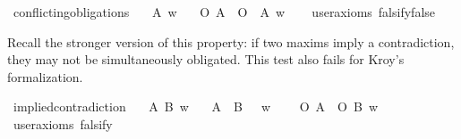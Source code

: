 \begin{isabellebody}
\begin{isamarkuptext}
\end{isamarkuptext}\isamarkuptrue%
\isamarkupfalse%
\ conflicting{\isacharunderscore}obligations{\isacharcolon}\isanewline
\ \ \ A\ w\isanewline
\ \ \ {\isachardoublequoteopen}{\isacharparenleft}O\ {\isacharbraceleft}A{\isacharbraceright}\ \isactrlbold {\isasymand}\ O\ {\isacharbraceleft}\isactrlbold {\isasymnot}\ A{\isacharbraceright}{\isacharparenright}\ w{\isachardoublequoteclose}\isanewline
\ \ \isamarkupfalse%
\ {\isacharbrackleft}user{\isacharunderscore}axioms{\isacharcomma}\ falsify{\isacharequal}false{\isacharbrackright}%
\isadelimproof
\ %
\endisadelimproof
%
\isatagproof
{}\isamarkupfalse%
\isanewline
%
%
\endisatagproof
{\isafoldproof}%
%
\isadelimproof
%
\endisadelimproof
%
\begin{isamarkuptext}%
Recall the stronger version of this property: if two maxims imply a
        contradiction, they may not be simultaneously obligated. This test also fails for Kroy's formalization.%
\end{isamarkuptext}\isamarkuptrue%
\isamarkupfalse%
\ implied{\isacharunderscore}contradiction{\isacharcolon}\isanewline
\ \ \ A\ B\ w\isanewline
\ \ \ {\isachardoublequoteopen}{\isacharparenleft}{\isacharparenleft}A\ \isactrlbold {\isasymand}\ B{\isacharparenright}\ \isactrlbold {\isasymrightarrow}\ \isactrlbold {\isasymbottom}{\isacharparenright}\ w{\isachardoublequoteclose}\isanewline
\ \ \ {\isachardoublequoteopen}\isactrlbold {\isasymnot}\ {\isacharparenleft}O\ {\isacharbraceleft}A{\isacharbraceright}\ \isactrlbold {\isasymand}\ O\ {\isacharbraceleft}B{\isacharbraceright}{\isacharparenright}\ w{\isachardoublequoteclose}\isanewline
\ \ \isamarkupfalse%
\ {\isacharbrackleft}user{\isacharunderscore}axioms{\isacharcomma}\ falsify{\isacharbrackright}%
\isadelimproof
\ %
\endisadelimproof
%
\isatagproof
{}\isamarkupfalse%
\isanewline
%
\end{isabellebody}
